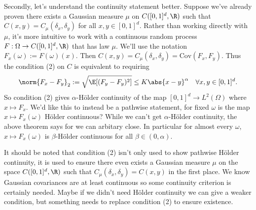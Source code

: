 \documentclass[fontsize=12pt, DIV=10]{scrreprt}
\theoremstyle{mydefn}
\theoremstyle{remark}
\newcommand{\defeq}{:=}
\begin{document}
Secondly, let's understand the continuity statement better. Suppose we've already proven there exists a Gaussian measure $\mu$ on $C([0, 1]^d, \R)$ such that $C(x, y) = C_{\mu}(\delta_x, \delta_y)$ for all $x, y \in [0, 1]^d$. Rather than working directly with $\mu$, it's more intuitive to work with a continuous random process $F: \Omega \to C([0, 1]^d, \R)$ that has law $\mu$. We'll use the notation $F_x(\omega) \defeq F(\omega)(x)$. Then $C(x, y) = C_{\mu}(\delta_x, \delta_y) = \text{Cov}(F_x, F_y)$. Thus the condition (2) on $C$ is equivalent to requiring
\begin{equation}
	\norm{F_x - F_y}_2 \defeq \sqrt{\E[(F_y - F_y)^2]} \leq K \abs{x - y}^{\alpha} \quad \forall x, y \in [0, 1]^d.
\end{equation}
So condition (2) gives $\alpha$-H\"older continuity of the map $[0, 1]^d \to L^2(\Omega)$ where $x \mapsto F_x$. We'd like this to instead be a pathwise statement, for fixed $\omega$ is the map $x \mapsto F_x(\omega)$ H\"older continuous? While we can't get $\alpha$-H\"older continuity, the above theorem says for we can arbitary close. In particular for almost every $\omega$, $x \mapsto F_x(\omega)$ is $\beta$-H\"older continuous for all $\beta \in (0, \alpha)$.

It should be noted that condition (2) isn't only used to show pathwise H\"older continuity, it is used to ensure there even exists a Gaussian measure $\mu$ on  the space $C([0, 1]^d, \R)$ such that $C_{\mu}(\delta_x, \delta_y) = C(x, y)$ in the first place. We know Gaussian covariances are at least continuous so some continuity criterion is certainly needed. Maybe if we didn't need H\"older continuity we can give a weaker condition, but something needs to replace condition (2) to ensure existence.
\end{document}
